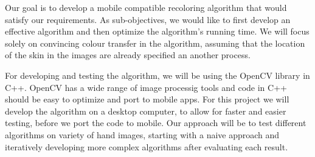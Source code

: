 \documentclass[12pt, a4paper]{article}
\begin{document}
Our goal is to develop a mobile compatible recoloring algorithm that would satisfy our requirements. As sub-objectives, we would like to first develop an effective algorithm and then optimize the algorithm's running time. We will focus solely on convincing colour transfer in the algorithm, assuming that the location of the skin in the images are already specified an another process.

For developing and testing the algorithm, we will be using the OpenCV library in C++. OpenCV has a wide range of image processig tools and code in C++ should be easy to optimize and port to mobile apps. For this project we will develop the algorithm on a desktop computer, to allow for faster and easier testing, before we port the code to mobile. Our approach will be to test different algorithms on variety of hand images, starting with a naive approach and iteratively developing more complex algorithms after evaluating each result.








\pagebreak



\pagebreak
\end{document}
